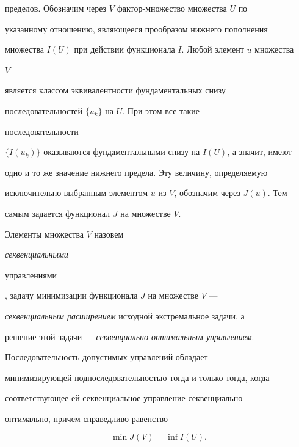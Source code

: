 пределов. Обозначим через $V$ фактор-множество множества $U$ по 


указанному отношению, являющееся прообразом нижнего пополнения 


множества $I(U)$ при действии функционала $I$. Любой элемент $u$ множества 


$V$ 


является классом эквивалентности фундаментальных снизу 


последовательностей $\{u_k\}$ на $U$. При этом все такие 


последовательности 


$\{I(u_k)\}$ оказываются фундаментальными снизу на $I(U)$, а значит, имеют 


одно и то же значение нижнего предела. Эту величину, определяемую 


исключительно выбранным элементом $u$ из $V$, обозначим через $J(u)$. Тем 


самым задается функционал $J$ на множестве $V$. 


 


\begin{defn} 


Элементы множества $V$ назовем {\it секвенциальными 


управлениями}, задачу минимизации функционала $J$ на множестве $V$ --- 


{\it секвенциальным расширением} исходной экстремальное задачи, а 


решение этой задачи --- {\it секвенциально оптимальным управлением}. 


\end{defn} 


 


\begin{thm} 


Последовательность допустимых управлений обладает 


минимизирующей подпоследовательностью тогда и только тогда, когда 


соответствующее ей секвенциальное управление секвенциально 


оптимально, причем справедливо равенство 


$$


\min J(V)=\inf I(U). 


$$


\end{thm} 


